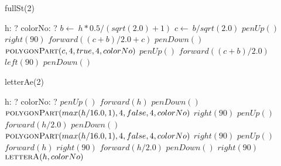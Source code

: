 \documentclass[a4paper,10pt]{article}
\begin{document}
\begin{algorithm}
\caption{fullSt(2)}
\begin{algorithmic}[5]
\State {}
\State {}
    \State h: ?
    \State colorNo: ?
  \EndDecl
  \State \(b\gets\ h*0.5/(sqrt(2.0)+1)\)
  \State \(c\gets\ b/sqrt(2.0)\)
  \State \(penUp()\)
  \State \(right(90)\)
  \State \(forward((c+b)/2.0+c)\)
  \State \(penDown()\)
  \State {}
  \State {}
  \State \(\Call{polygonPart}{c,4,true,4,colorNo}\)
  \State \(penUp()\)
  \State \(forward((c+b)/2.0)\)
  \State \(left(90)\)
  \State \(penDown()\)
\EndProcedure
\end{algorithmic}
\end{algorithm}


\begin{algorithm}
\caption{letterAe(2)}
\begin{algorithmic}[5]
\State {}
\State {}
    \State h: ?
    \State colorNo: ?
  \EndDecl
  \State \(penUp()\)
  \State \(forward(h)\)
  \State \(penDown()\)
  \State {}
  \State {}
  \State \(\Call{polygonPart}{max(h/16.0,1),4,false,4,colorNo}\)
  \State \(right(90)\)
  \State \(penUp()\)
  \State \(forward(h/2.0)\)
  \State \(penDown()\)
  \State {}
  \State {}
  \State \(\Call{polygonPart}{max(h/16.0,1),4,false,4,colorNo}\)
  \State \(right(90)\)
  \State \(penUp()\)
  \State \(forward(h)\)
  \State \(right(90)\)
  \State \(forward(h/2.0)\)
  \State \(penDown()\)
  \State \(right(90)\)
  \State \(\Call{letterA}{h,colorNo}\)
\EndProcedure
\end{algorithmic}
\end{algorithm}
\end{document}

